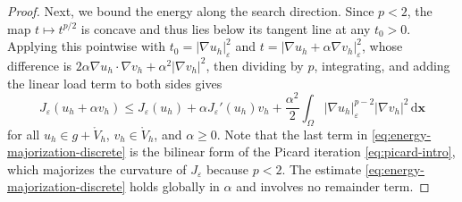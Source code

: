 \documentclass[10pt,a4paper]{amsart}
\newcommand{\bs}[1]{\ensuremath{\boldsymbol{#1}}}
\begin{document}
\begin{proof}
Next, we bound the energy along the search direction. Since $p<2$, the map $t\mapsto t^{p/2}$ is concave and thus lies below its tangent line at any $t_0>0$.
Applying this pointwise with $t_0=|\nabla u_h|_\varepsilon^2$ and $t=|\nabla u_h+\alpha\nabla v_h|_\varepsilon^2$, whose difference is $2\alpha\nabla u_h\!\cdot\!\nabla v_h+\alpha^2|\nabla v_h|^2$, then dividing by $p$, integrating, and adding the linear load term to both sides gives
\begin{equation}\label{eq:energy-majorization-discrete}
  J_\varepsilon(u_h+\alpha v_h)
  \le J_\varepsilon(u_h)+\alpha J_\varepsilon'(u_h)v_h
  +\frac{\alpha^2}{2}\int_\Omega
  |\nabla u_h|_\varepsilon^{p-2}|\nabla v_h|^2\,\mathrm{d}\bs x
\end{equation}
for all $u_h\in g+\mathring V_h$, $v_h\in\mathring V_h$, and $\alpha\ge0$. Note that the last term in \eqref{eq:energy-majorization-discrete} is the bilinear form of the Picard iteration \eqref{eq:picard-intro}, which majorizes the curvature of $J_\varepsilon$ because $p<2$. The estimate \eqref{eq:energy-majorization-discrete} holds globally in $\alpha$ and involves no remainder term.


\end{proof}
\end{document}

